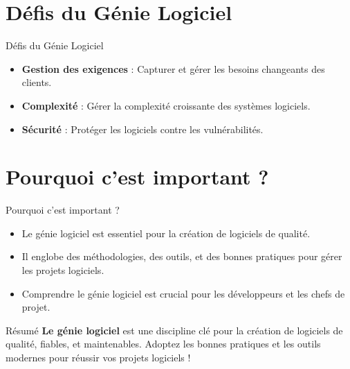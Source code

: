 \documentclass{clbeamer2024}
\begin{document}
	\section{Défis du Génie Logiciel}
	\begin{frame}{Défis du Génie Logiciel}
		\begin{itemize}
			\item \textbf{Gestion des exigences} : Capturer et gérer les besoins changeants des clients.
			\item \textbf{Complexité} : Gérer la complexité croissante des systèmes logiciels.
			\item \textbf{Sécurité} : Protéger les logiciels contre les vulnérabilités.
		\end{itemize}
	\end{frame}
	
	\section{Pourquoi c'est important ?}
	\begin{frame}{Pourquoi c'est important ?}
		\begin{itemize}
			\item Le génie logiciel est essentiel pour la création de logiciels de qualité.
			\item Il englobe des méthodologies, des outils, et des bonnes pratiques pour gérer les projets logiciels.
			\item Comprendre le génie logiciel est crucial pour les développeurs et les chefs de projet.
		\end{itemize}
	\end{frame}
	
	\begin{frame}{Résumé}
		\textbf{Le génie logiciel} est une discipline clé pour la création de logiciels de qualité, fiables, et maintenables.  
		Adoptez les bonnes pratiques et les outils modernes pour réussir vos projets logiciels ! 
	\end{frame}



	
	
\end{document}
